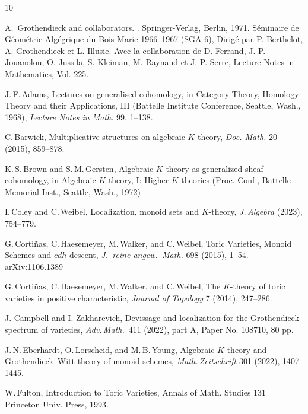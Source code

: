 \documentclass[12pt]{amsart}
\numberwithin{equation}{section}
\theoremstyle{plain}
\theoremstyle{definition}
\theoremstyle{remark}
\begin{document}
\begin{thebibliography}{10}	

A.~Grothendieck and collaborators.
.
\newblock Springer-Verlag, Berlin, 1971.
\newblock S\'eminaire de G\'eom\'etrie Alg\'egrique du Bois-Marie 1966--1967
(SGA 6), Dirig\'e par P. Berthelot, A. Grothendieck et L. Illusie. Avec la
collaboration de D. Ferrand, J. P. Jouanolou, O. Jussila, S. Kleiman, M.
Raynaud et J. P. Serre, Lecture Notes in Mathematics, Vol. 225.

J.\,F.\,Adams,
Lectures on generalised cohomology,
in Category {T}heory, {H}omology {T}heory and their
{A}pplications, {III} ({B}attelle {I}nstitute {C}onference,
{S}eattle, {W}ash., 1968),
{\it Lecture Notes in Math.} 99, 1--138.

C.\,Barwick,
Multiplicative structures on algebraic {$K$}-theory,
{\it Doc. Math.} 20 (2015), 859--878.

K.\,S.\,Brown and S.\,M.\,Gersten,
Algebraic {$K$}-theory as generalized sheaf cohomology,
in Algebraic {$K$}-theory, {I}: {H}igher {$K$}-theories ({P}roc.
{C}onf., {B}attelle {M}emorial {I}nst., {S}eattle, {W}ash.,
1972)

I.\,Coley and C.\,Weibel,
Localization, monoid sets and $K$-theory,
{\it J.\,Algebra} (2023), 754--779.

G.\,Corti\~nas,  C.\,Haesemeyer, M.\,Walker, and C.\,Weibel,
Toric Varieties, Monoid Schemes and $cdh$ descent,
{\it J.\ reine angew.\ Math.} 698 (2015), 1--54.
arXiv:1106.1389

G.\,Corti\~nas,  C.\,Haesemeyer, M.\,Walker, and C.\,Weibel,
The $K$-theory of toric varieties in positive characteristic,
{\it Journal of Topology} 7 (2014), 247--286.

J. Campbell and I. Zakharevich,
Devissage and localization for the Grothendieck spectrum of varieties,
{\it Adv.\,Math.\,} 411 (2022), part A, Paper No. 108710, 80 pp.

J.\,N.\,Eberhardt, O.\,Lorscheid, and M.\,B.\,Young,
Algebraic $K$-theory and Grothendieck--Witt theory of monoid schemes,
{\it Math.\,Zeitschrift} 301 (2022), 1407--1445.

W.\,Fulton,
Introduction to Toric Varieties,
Annals of Math. Studies 131 Princeton Univ. Press, 1993.


\end{thebibliography}
\end{document}
